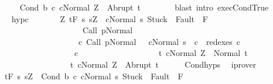 \begin{isabellebody}
\ \ \ \ \isamarkupfalse%
\ {\isachardoublequoteopen}{\isasymGamma}{\isasymturnstile}{\isasymlangle}Cond\ b\ c{}\ c{}{\isacharcomma}Normal\ Z{\isasymrangle}\ {\isasymRightarrow}\ Abrupt\ t{\isachardoublequoteclose}\isanewline
\ \ \ \ \ \ \isamarkupfalse%
\ {\isacharparenleft}blast\ intro{\isacharcolon}\ exec{\isachardot}CondTrue{\isacharparenright}\isanewline
\ \ \isamarkupfalse%
\isanewline
\ \ \isamarkupfalse%
\isanewline
\ \ \isamarkupfalse%
\ hyp{\isacharunderscore}c{}{\isacharcolon}\isanewline
\ \ \ \ \ \ \ {\isachardoublequoteopen}{\isasymforall}Z{\isachardot}\ {\isasymGamma}{\isacharcomma}{\isasymTheta}{\isasymturnstile}\isactrlsub t\isactrlbsub {\isacharslash}F\isactrlesub \ {\isacharbraceleft}s{\isachardot}\ s{\isacharequal}Z\ {\isasymand}\ {\isasymGamma}{\isasymturnstile}{\isasymlangle}c{}{\isacharcomma}Normal\ s{\isasymrangle}\ {\isasymRightarrow}{\isasymnotin}{\isacharparenleft}{\isacharbraceleft}Stuck{\isacharbraceright}\ {\isasymunion}\ Fault\ {\isacharbackquote}\ {\isacharparenleft}{\isacharminus}F{\isacharparenright}{\isacharparenright}\ {\isasymand}\ \isanewline
\ \ \ \ \ \ \ \ \ \ \ \ \ \ \ \ \ \ \ \ \ {\isasymGamma}{\isasymturnstile}Call\ p{\isasymdown}Normal\ {\isasymsigma}\ {\isasymand}\isanewline
\ \ \ \ \ \ \ \ \ \ \ \ \ \ \ \ \ \ \ \ {\isacharparenleft}{\isasymexists}c{\isacharprime}{\isachardot}\ {\isasymGamma}{\isasymturnstile}{\isacharparenleft}Call\ p{\isacharcomma}Normal\ {\isasymsigma}{\isacharparenright}\ {\isasymrightarrow}\isactrlsup {\isacharplus}\ {\isacharparenleft}c{\isacharprime}{\isacharcomma}Normal\ s{\isacharparenright}\ {\isasymand}\ c{}\ {\isasymin}\ redexes\ c{\isacharprime}{\isacharparenright}{\isacharbraceright}\isanewline
\ \ \ \ \ \ \ \ \ \ \ \ \ \ \ \ \ \ \ c{}\ \isanewline
\ \ \ \ \ \ \ \ \ \ \ \ \ \ \ \ \ \ {\isacharbraceleft}t{\isachardot}\ {\isasymGamma}{\isasymturnstile}{\isasymlangle}c{}{\isacharcomma}Normal\ Z{\isasymrangle}\ {\isasymRightarrow}\ Normal\ t{\isacharbraceright}{\isacharcomma}\isanewline
\ \ \ \ \ \ \ \ \ \ \ \ \ \ \ \ \ \ {\isacharbraceleft}t{\isachardot}\ {\isasymGamma}{\isasymturnstile}{\isasymlangle}c{}{\isacharcomma}Normal\ Z{\isasymrangle}\ {\isasymRightarrow}\ Abrupt\ t{\isacharbraceright}{\isachardoublequoteclose}\isanewline
\ \ \ \ \isamarkupfalse%
\ Cond{\isachardot}hyps\ \isamarkupfalse%
\ iprover\isanewline
\ \ \isamarkupfalse%
\ \isanewline
\ \ {\isachardoublequoteopen}{\isasymGamma}{\isacharcomma}{\isasymTheta}{\isasymturnstile}\isactrlsub t\isactrlbsub {\isacharslash}F\isactrlesub \ {\isacharparenleft}{\isacharbraceleft}s{\isachardot}\ s{\isacharequal}Z\ {\isasymand}\ {\isasymGamma}{\isasymturnstile}{\isasymlangle}Cond\ b\ c{}\ c{}{\isacharcomma}Normal\ s{\isasymrangle}\ {\isasymRightarrow}{\isasymnotin}{\isacharparenleft}{\isacharbraceleft}Stuck{\isacharbraceright}\ {\isasymunion}\ Fault\ {\isacharbackquote}\ {\isacharparenleft}{\isacharminus}F{\isacharparenright}{\isacharparenright}\ {\isasymand}\ \isanewline

\end{isabellebody}

